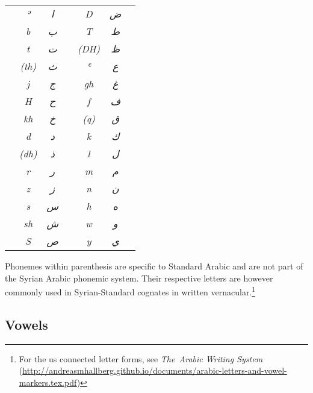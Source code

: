 \documentclass[oneside,a4paper]{article}
\begin{document}
\begin{multicols}{2}

  \begin{tabularx}{\linewidth}{X>{\itshape}c>{\itshape}cX>{\itshape}c>{\itshape}cX}

&ʾ    & \textarabic{ا}&& D   & \textarabic{ض}   &    \\
&b    & \textarabic{ب}&& T    & \textarabic{ط}  &     \\
&t    & \textarabic{ت}&& (DH) & \textarabic{ظ}  &     \\
&(th) & \textarabic{ث}&& ʿ    & \textarabic{ع}  &     \\
&j    & \textarabic{ج}&& gh   & \textarabic{غ}  &     \\
&H    & \textarabic{ح}&& f    & \textarabic{ف}  &     \\
&kh   & \textarabic{خ}&& (q)  & \textarabic{ق}  &     \\
&d    & \textarabic{د}&& k    & \textarabic{ك}  &     \\
&(dh) & \textarabic{ذ}&& l    & \textarabic{ل}  &     \\
&r    & \textarabic{ر}&& m    & \textarabic{م}  &     \\
&z    & \textarabic{ز}&& n    & \textarabic{ن}  &     \\
&s    & \textarabic{س}&& h    & \textarabic{ه}  &     \\
&sh   & \textarabic{ش}&& w    & \textarabic{و}  &     \\
&S    & \textarabic{ص}&& y    & \textarabic{ي}  &    \\
                 
\end{tabularx}

Phonemes within parenthesis are specific to Standard Arabic and are not part of the Syrian Arabic phonemic system. Their respective letters are however commonly used in Syrian-Standard cognates in written vernacular.\footnote{For the us connected letter forms, see \textit{The~Arabic Writing System} (\url{http://andreasmhallberg.github.io/documents/arabic-letters-and-vowel-markers.tex.pdf})} 

\end{multicols}

\subsection{Vowels}
\needspace{5cm}
\end{document}
